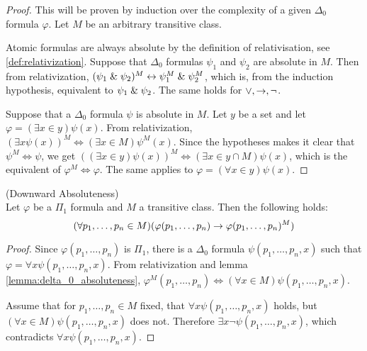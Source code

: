 \begin{proof}
This will be proven by induction over the complexity of a given $\Delta_0$ formula $\varphi$. Let $M$ be an arbitrary transitive class. 

Atomic formulas are always absolute by the definition of relativisation, see \ref{def:relativization}.
Suppose that $\Delta_0$ formulas $\psi_1$ and $\psi_2$ are absolute in $M$. Then from relativization, $(\psi_1 \mathrel{\&} \psi_2)^M \leftrightarrow \psi_1^M \mathrel{\&} \psi_2^M$, which is, from the induction hypothesis, equivalent to $\psi_1 \mathrel{\&} \psi_2$. The same holds for $\lor, \rightarrow, \neg$.

Suppose that a $\Delta_0$ formula $\psi$ is absolute in $M$. Let $y$ be a set and let $\varphi = (\exists x \in y) \psi(x)$. 
From relativization, $(\exists x \psi(x))^M \iff (\exists x \in M) \psi^M(x)$. Since the hypotheses makes it clear that $\psi^M \iff \psi$, we get $((\exists x \in y) \psi(x))^M \iff (\exists x \in y\cap M) \psi(x)$, which is the equivalent of $\varphi^M \iff \varphi$. The same applies to $\varphi = (\forall x \in y) \psi(x)$.
\end{proof}

\begin{lemma}{(Downward Absoluteness)}\label{lemma:downward_absoluteness}\\
Let $\varphi$ be a $\Pi_1$ formula and $M$ a transitive class. Then the following holds:
\begin{equation}
(\forall p_1, \ldots, p_n \in M)(\varphi(p_1, \ldots, p_n) \rightarrow \varphi(p_1, \ldots, p_n)^M)
\end{equation}
\end{lemma}
\begin{proof}
Since $\varphi(p_1, \ldots, p_n)$ is $\Pi_1$, there is a $\Delta_0$ formula $\psi(p_1, \ldots, p_n, x)$ such that $\varphi = \forall x \psi(p_1, \ldots, p_n, x)$. From relativization and lemma \ref{lemma:delta_0_absoluteness}, $\varphi^M(p_1, \ldots, p_n) \iff (\forall x \in M)\psi(p_1, \ldots, p_n, x)$.

Assume that for $p_1, \ldots, p_n \in M$ fixed, that $\forall x \psi(p_1, \ldots, p_n, x)$ holds, but $(\forall x \in M)\psi(p_1, \ldots, p_n, x)$ does not. 
Therefore $\exists x \neg \psi(p_1, \ldots, p_n, x)$, which contradicts $\forall x \psi(p_1, \ldots, p_n, x)$.
\end{proof}


